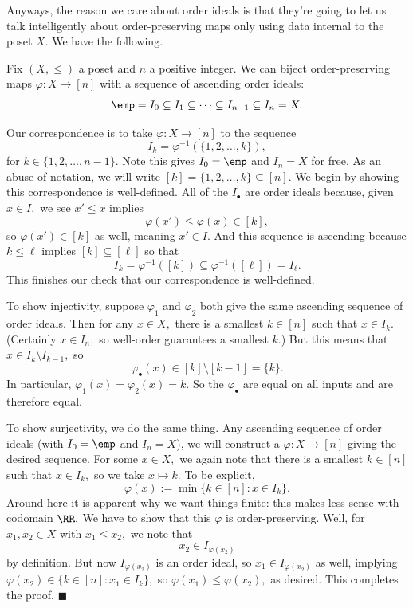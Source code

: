 Anyways, the reason we care about order ideals is that they're going to let us talk intelligently about order-preserving maps only using data internal to the poset $X.$ We have the following.
\begin{proposition}
    Fix $(X,\le)$ a poset and $n$ a positive integer. We can biject order-preserving maps $\varphi:X\to[n]$ with a sequence of ascending order ideals:
    \[\emp=I_0\subseteq I_1\subseteq\cdots\subseteq I_{n-1}\subseteq I_n=X.\]
\end{proposition}
Our correspondence is to take $\varphi:X\to[n]$ to the sequence
\[I_k=\varphi^{-1}(\{1,2,\ldots,k\}),\]
for $k\in\{1,2,\ldots,n-1\}.$ Note this gives $I_0=\emp$ and $I_n=X$ for free. As an abuse of notation, we will write $[k]=\{1,2,\ldots,k\}\subseteq[n].$ We begin by showing this correspondence is well-defined. All of the $I_\bullet$ are order ideals because, given $x\in I,$ we see $x'\le x$ implies
\[\varphi(x')\le\varphi(x)\in[k],\]
so $\varphi(x')\in[k]$ as well, meaning $x'\in I.$ And this sequence is ascending because $k\le\ell$ implies $[k]\subseteq[\ell]$ so that
\[I_k=\varphi^{-1}([k])\subseteq\varphi^{-1}([\ell])=I_\ell.\]
This finishes our check that our correspondence is well-defined.

To show injectivity, suppose $\varphi_1$ and $\varphi_2$ both give the same ascending sequence of order ideals. Then for any $x\in X,$ there is a smallest $k\in[n]$ such that $x\in I_k.$ (Certainly $x\in I_n,$ so well-order guarantees a smallest $k.$) But this means that $x\in I_k\setminus I_{k-1},$ so
\[\varphi_\bullet(x)\in[k]\setminus[k-1]=\{k\}.\]
In particular, $\varphi_1(x)=\varphi_2(x)=k.$ So the $\varphi_\bullet$ are equal on all inputs and are therefore equal.

To show surjectivity, we do the same thing. Any ascending sequence of order ideals (with $I_0=\emp$ and $I_n=X$), we will construct a $\varphi:X\to[n]$ giving the desired sequence. For some $x\in X,$ we again note that there is a smallest $k\in[n]$ such that $x\in I_k,$ so we take $x\mapsto k.$ To be explicit,
\[\varphi(x):=\min\{k\in[n]:x\in I_k\}.\]
Around here it is apparent why we want things finite: this makes less sense with codomain $\RR.$ We have to show that this $\varphi$ is order-preserving. Well, for $x_1,x_2\in X$ with $x_1\le x_2,$ we note that
\[x_2\in I_{\varphi(x_2)}\]
by definition. But now $I_{\varphi(x_2)}$ is an order ideal, so $x_1\in I_{\varphi(x_2)}$ as well, implying $\varphi(x_2)\in\{k\in[n]:x_1\in I_k\},$ so $\varphi(x_1)\le\varphi(x_2),$ as desired. This completes the proof. $\blacksquare$

